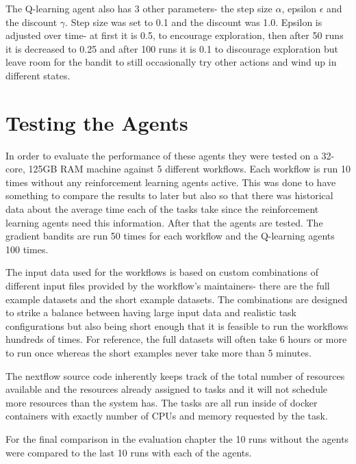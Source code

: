 The Q-learning agent also has 3 other parameters- the step size $\alpha$, epsilon $\epsilon$ and the discount $\gamma$. Step size was set to 0.1 and the discount was 1.0. Epsilon is adjusted over time- at first it is 0.5, to encourage exploration, then after 50 runs it is decreased to 0.25 and after 100 runs it is 0.1 to discourage exploration but leave room for the bandit to still occasionally try other actions and wind up in different states.

\section{Testing the Agents}
\label{sec:testing}

In order to evaluate the performance of these agents they were tested on a 32-core, 125GB RAM machine against 5 different workflows. Each workflow is run 10 times without any reinforcement learning agents active. This was done to have something to compare the results to later but also so that there was historical data about the average time each of the tasks take since the reinforcement learning agents need this information. After that the agents are tested. The gradient bandits are run 50 times for each workflow and the Q-learning agents 100 times.

The input data used for the workflows is based on custom combinations of different input files provided by the workflow's maintainers- there are the full example datasets and the short example datasets. The combinations are designed to strike a balance between having large input data and realistic task configurations but also being short enough that it is feasible to run the workflows hundreds of times. For reference, the full datasets will often take 6 hours or more to run once whereas the short examples never take more than 5 minutes. 

The nextflow source code inherently keeps track of the total number of resources available and the resources already assigned to tasks and it will not schedule more resources than the system has. The tasks are all run inside of docker containers with exactly number of CPUs and memory requested by the task. 

For the final comparison in the evaluation chapter the 10 runs without the agents were compared to the last 10 runs with each of the agents.


